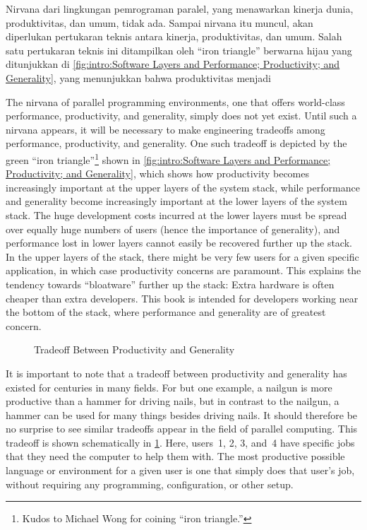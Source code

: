 Nirvana dari lingkungan pemrograman paralel, yang menawarkan kinerja
dunia, produktivitas, dan umum, tidak ada.
Sampai nirvana itu muncul, akan diperlukan pertukaran teknis antara
kinerja, produktivitas, dan umum.
Salah satu pertukaran teknis ini ditampilkan oleh ``iron triangle'' berwarna
hijau yang ditunjukkan di \cref{fig:intro:Software Layers and Performance;
Productivity; and Generality}, yang menunjukkan bahwa produktivitas menjadi


The nirvana of parallel programming environments, one that offers
world-class performance, productivity, and generality, simply does
not yet exist.
Until such a nirvana appears, it will be necessary to make engineering
tradeoffs among performance, productivity, and generality.
One such tradeoff is depicted by the green ``iron triangle''\footnote{
	Kudos to Michael Wong for coining ``iron triangle.''}
shown in
\cref{fig:intro:Software Layers and Performance; Productivity; and Generality},
which shows how productivity becomes increasingly important at the upper layers
of the system stack,
while performance and generality become increasingly important at the
lower layers of the system stack.
The huge development costs incurred at the lower layers
must be spread over equally huge numbers of users
(hence the importance of generality), and
performance lost in lower layers cannot easily be
recovered further up the stack.
In the upper layers of the stack, there might be very few users for a given
specific application, in which case productivity concerns are paramount.
This explains the tendency towards ``bloatware'' further up the stack:
Extra hardware is often cheaper than extra developers.
This book is intended for developers working near the bottom
of the stack, where performance and generality are of greatest concern.

\begin{figure}
\centering
{}
\caption{Tradeoff Between Productivity and Generality}
\label{fig:intro:Tradeoff Between Productivity and Generality}
\end{figure}

It is important to note that a tradeoff between productivity and
generality has existed for centuries in many fields.
For but one example, a nailgun is more productive than a hammer for
driving nails, but in contrast to the nailgun, a hammer can be used for
many things besides driving nails.
It should therefore be no surprise to see similar tradeoffs
appear in the field of parallel computing.
This tradeoff is shown schematically in
\cref{fig:intro:Tradeoff Between Productivity and Generality}.
Here, users~1, 2, 3, and~4 have specific jobs that they need the computer
to help them with.
The most productive possible language or environment for a given user is one
that simply does that user's job, without requiring any programming,
configuration, or other setup.


